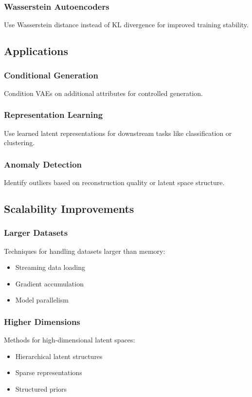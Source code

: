\documentclass{article}
\begin{document}
\subsubsection{Wasserstein Autoencoders}
Use Wasserstein distance instead of KL divergence for improved training stability.

\subsection{Applications}

\subsubsection{Conditional Generation}
Condition VAEs on additional attributes for controlled generation.

\subsubsection{Representation Learning}
Use learned latent representations for downstream tasks like classification or clustering.

\subsubsection{Anomaly Detection}
Identify outliers based on reconstruction quality or latent space structure.

\subsection{Scalability Improvements}

\subsubsection{Larger Datasets}
Techniques for handling datasets larger than memory:
\begin{itemize}
\item Streaming data loading
\item Gradient accumulation
\item Model parallelism
\end{itemize}

\subsubsection{Higher Dimensions}
Methods for high-dimensional latent spaces:
\begin{itemize}
\item Hierarchical latent structures
\item Sparse representations
\item Structured priors
\end{itemize}
\end{document}
